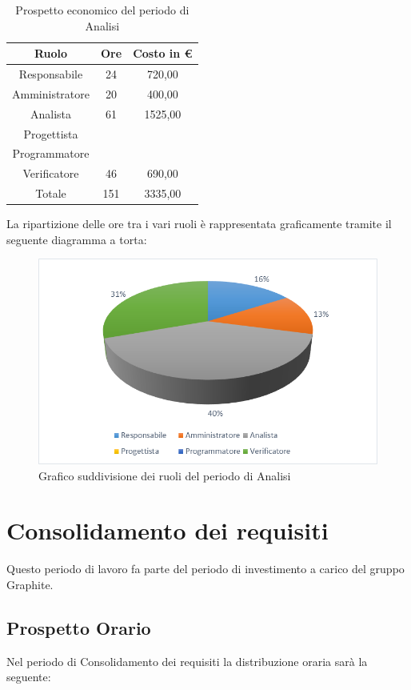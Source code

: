 \documentclass[./PianodiProgetto.tex]{subfiles}
\begin{document}
\begin{table}[H]
	\centering
	\begin{tabular}{|c|c|c|}
		\hline
		Ruolo&Ore&Costo in \euro{} \\ \hline
		Responsabile&24&720,00  \\ \hline
		Amministratore&20&400,00  \\ \hline
		Analista&61&1525,00  \\ \hline
		Progettista& &  \\ \hline
		Programmatore& &  \\ \hline
		Verificatore&46&690,00  \\ \hline
		Totale&151&3335,00 \\ \hline
	\end{tabular}
	\caption{Prospetto economico del periodo di Analisi}
\end{table}

La ripartizione delle ore tra i vari ruoli è rappresentata graficamente tramite il seguente diagramma a torta:

\begin{figure}[H]
	\centering
	\includegraphics[width=1\linewidth]{img/grafici/AnalisiProspettoEconomico}
	\caption{Grafico suddivisione dei ruoli del periodo di Analisi}
	\label{fig:analisi-prospetto-economico}
\end{figure}


\section{Consolidamento dei requisiti}
Questo periodo di lavoro fa parte del periodo di investimento a carico del gruppo Graphite.
\subsection{Prospetto Orario}
Nel periodo di Consolidamento dei requisiti la distribuzione oraria sarà la seguente:
\end{document}
